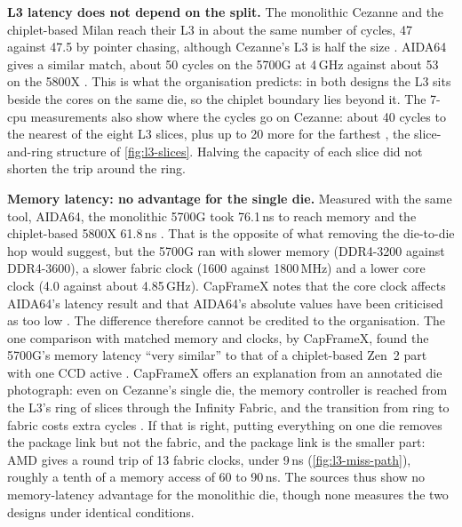 \textbf{L3 latency does not depend on the split.} The monolithic Cezanne and the chiplet-based Milan reach their L3 in about the same number of cycles, 47 against 47.5 by pointer chasing, although Cezanne's L3 is half the size \cite{7-cpu.comAMDZen3,cozmaAMDsVCacheTested2022}. AIDA64 gives a similar match, about 50 cycles on the 5700G at 4\,GHz against about 53 on the 5800X \cite{devtechprofileWhomCezanneCould2021,justiceAMDRyzen72021}. This is what the organisation predicts: in both designs the L3 sits beside the cores on the same die, so the chiplet boundary lies beyond it. The 7-cpu measurements also show where the cycles go on Cezanne: about 40 cycles to the nearest of the eight L3 slices, plus up to 20 more for the farthest \cite{7-cpu.comAMDZen3}, the slice-and-ring structure of \cref{fig:l3-slices}. Halving the capacity of each slice did not shorten the trip around the ring.

\textbf{Memory latency: no advantage for the single die.} Measured with the same tool, AIDA64, the monolithic 5700G took 76.1\,ns to reach memory and the chiplet-based 5800X 61.8\,ns \cite{devtechprofileWhomCezanneCould2021,justiceAMDRyzen72021}. That is the opposite of what removing the die-to-die hop would suggest, but the 5700G ran with slower memory (DDR4-3200 against DDR4-3600), a slower fabric clock (1600 against 1800\,MHz) and a lower core clock (4.0 against about 4.85\,GHz). CapFrameX notes that the core clock affects AIDA64's latency result and that AIDA64's absolute values have been criticised as too low \cite{devtechprofileWhomCezanneCould2021}. The difference therefore cannot be credited to the organisation. The one comparison with matched memory and clocks, by CapFrameX, found the 5700G's memory latency ``very similar'' to that of a chiplet-based Zen~2 part with one CCD active \cite{devtechprofileWhomCezanneCould2021}. CapFrameX offers an explanation from an annotated die photograph: even on Cezanne's single die, the memory controller is reached from the L3's ring of slices through the Infinity Fabric, and the transition from ring to fabric costs extra cycles \cite{devtechprofileWhomCezanneCould2021}. If that is right, putting everything on one die removes the package link but not the fabric, and the package link is the smaller part: AMD gives a round trip of 13 fabric clocks, under 9\,ns (\cref{fig:l3-miss-path}), roughly a tenth of a memory access of 60 to 90\,ns. The sources thus show no memory-latency advantage for the monolithic die, though none measures the two designs under identical conditions.

